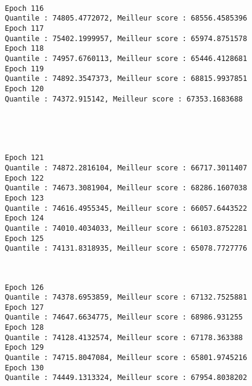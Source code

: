 \documentclass[11pt]{article}
\begin{document}
    \begin{center}
    \end{center}
    { \hspace*{\fill} \\}
    
    \begin{Verbatim}[commandchars=\\\{\}]
Epoch 116
Quantile : 74805.4772072, Meilleur score : 68556.4585396
Epoch 117
Quantile : 75402.1999957, Meilleur score : 65974.8751578
Epoch 118
Quantile : 74957.6760113, Meilleur score : 65446.4128681
Epoch 119
Quantile : 74892.3547373, Meilleur score : 68815.9937851
Epoch 120
Quantile : 74372.915142, Meilleur score : 67353.1683688

    \end{Verbatim}

    \begin{center}
    \end{center}
    { \hspace*{\fill} \\}
    
    \begin{center}
    \end{center}
    { \hspace*{\fill} \\}
    
    \begin{Verbatim}[commandchars=\\\{\}]
Epoch 121
Quantile : 74872.2816104, Meilleur score : 66717.3011407
Epoch 122
Quantile : 74673.3081904, Meilleur score : 68286.1607038
Epoch 123
Quantile : 74616.4955345, Meilleur score : 66057.6443522
Epoch 124
Quantile : 74010.4034033, Meilleur score : 66103.8752281
Epoch 125
Quantile : 74131.8318935, Meilleur score : 65078.7727776

    \end{Verbatim}

    \begin{center}
    \end{center}
    { \hspace*{\fill} \\}
    
    \begin{Verbatim}[commandchars=\\\{\}]
Epoch 126
Quantile : 74378.6953859, Meilleur score : 67132.7525881
Epoch 127
Quantile : 74647.6634775, Meilleur score : 68986.931255
Epoch 128
Quantile : 74128.4132574, Meilleur score : 67178.363388
Epoch 129
Quantile : 74715.8047084, Meilleur score : 65801.9745216
Epoch 130
Quantile : 74449.1313324, Meilleur score : 67954.8038202

    \end{Verbatim}
\end{document}
